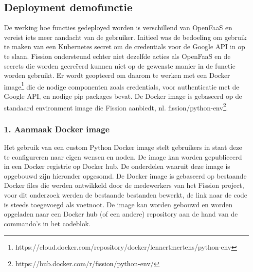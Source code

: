 \subsection{Deployment demofunctie}
De werking hoe functies gedeployed worden is verschillend van OpenFaaS en vereist iets meer aandacht van de gebruiker. Initieel was de bedoeling om gebruik te maken van een Kubernetes secret om de credentials voor de Google API in op te slaan. Fission ondersteund echter niet dezelfde acties als OpenFaaS en de secrets die worden gecreëerd kunnen  niet op de gewenste manier in de functie worden gebruikt. Er wordt geopteerd om daarom te werken met een Docker image\footnote{https://cloud.docker.com/repository/docker/lennertmertens/python-env} die de nodige componenten zoals credentials, voor authenticatie met de Google API, en nodige pip packages bevat. De Docker image is gebaseerd op de standaard environment image die Fission aanbiedt, nl. fission/python-env\footnote{https://hub.docker.com/r/fission/python-env/}.

\subsubsection{1. Aanmaak Docker image}
Het gebruik van een custom Python Docker image stelt gebruikers in staat deze te configureren naar eigen wensen en noden. De image kan worden gepubliceerd in een Docker registrie op Docker hub. De onderdelen waaruit deze image is opgebouwd zijn hieronder opgesomd. De Docker image is gebaseerd op bestaande Docker files die werden ontwikkeld door de medewerkers van het Fission project, voor dit onderzoek werden de bestaande bestanden bewerkt, de link naar de code is steeds toegevoegd als voetnoot. De image kan worden gebouwd en worden opgeladen naar een Docker hub (of een andere) repository aan de hand van de commando's in het codeblok.


